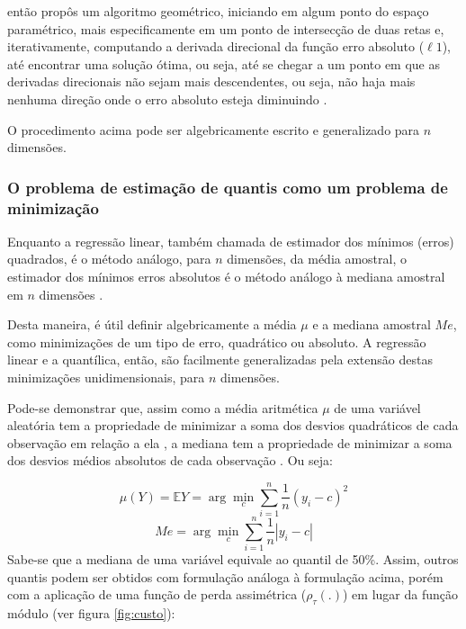 \documentclass[a4paper, 12pt]{article}
\begin{document}
\textcite{edgeworth1888} então propôs um algoritmo geométrico, iniciando
em algum ponto do espaço paramétrico, mais especificamente em um ponto
de intersecção de duas retas e, iterativamente, computando a derivada
direcional da função erro absoluto (\(\ell1\)), até encontrar uma
solução ótima, ou seja, até se chegar a um ponto em que as derivadas
direcionais não sejam mais descendentes, ou seja, não haja mais nenhuma
direção onde o erro absoluto esteja diminuindo \autocite[ver][
356-358]{koenker2000}.

O procedimento acima pode ser algebricamente escrito e generalizado para
\(n\) dimensões.

\hypertarget{o-problema-de-estimacao-de-quantis-como-um-problema-de-minimizacao}{%
\subsubsection{O problema de estimação de quantis como um problema de
minimização}\label{o-problema-de-estimacao-de-quantis-como-um-problema-de-minimizacao}}

Enquanto a regressão linear, também chamada de estimador dos mínimos
(erros) quadrados, é o método análogo, para \(n\) dimensões, da média
amostral, o estimador dos mínimos erros absolutos é o método análogo à
mediana amostral em \(n\) dimensões \autocite[618]{basset}.

Desta maneira, é útil definir algebricamente a média \(\mu\) e a mediana
amostral \(Me\), como minimizações de um tipo de erro, quadrático ou
absoluto. A regressão linear e a quantílica, então, são facilmente
generalizadas pela extensão destas minimizações unidimensionais, para
\(n\) dimensões.

Pode-se demonstrar que, assim como a média aritmética \(\mu\) de uma
variável aleatória tem a propriedade de minimizar a soma dos desvios
quadráticos de cada observação em relação a ela
\autocite[50]{matloff2017}, a mediana tem a propriedade de minimizar a
soma dos desvios médios absolutos de cada observação \autocite[
260]{matloff2017}. Ou seja:

\[\mu(Y) = \mathbb{E}Y = \arg \min_c \sum_{i = 1}^n \frac{1}{n}(y_i - c)^2\]
\[Me = \arg \min_c \sum_{i = 1}^n \frac{1}{n}|y_i - c|\] Sabe-se que a
mediana de uma variável equivale ao quantil de 50\%. Assim, outros
quantis podem ser obtidos com formulação análoga à formulação acima,
porém com a aplicação de uma função de perda assimétrica
(\(\rho_\tau(.)\)) em lugar da função módulo (ver figura
\ref{fig:custo}):
\end{document}

